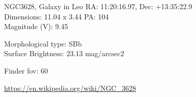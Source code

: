 \begin{block}{NGC3628, Galaxy in Leo}
    RA: 11:20:16.97, Dec: +13:35:22.9 \\ 
    Dimensions: 11.04 x 3.44 PA: 104 \\ 
    Magnitude (V): 9.45

    Morphological type: SBb \\ 
    Surface Brightness: 23.13 mag/arcsec2 


    Finder fov: 60 

    \url{https://en.wikipedia.org/wiki/NGC_3628} 
\end{block}